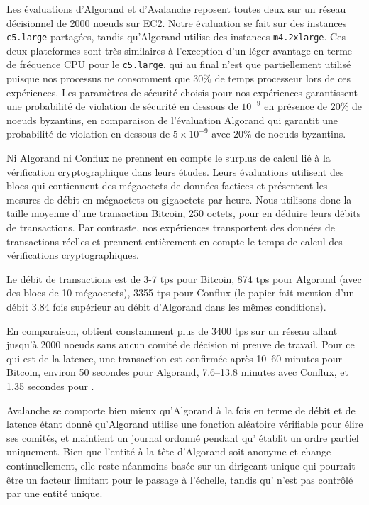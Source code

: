 Les évaluations d'Algorand et d'Avalanche reposent toutes deux sur un réseau décisionnel de 2000 noeuds sur EC2.
Notre évaluation se fait sur des instances \texttt{c5.large} partagées, tandis qu'Algorand utilise des instances
\texttt{m4.2xlarge}\@. Ces deux plateformes sont très similaires à l'exception d'un léger avantage en terme de
fréquence CPU pour le \texttt{c5.large}, qui au final n'est que partiellement utilisé puisque nos processus ne
consomment que $30\%$ de temps processeur lors de ces expériences. Les paramètres de sécurité choisis pour nos
expériences garantissent une probabilité de violation de sécurité en dessous de $10^{-9}$ en présence de
$20\%$ de noeuds byzantins, en comparaison de l'évaluation Algorand qui garantit une probabilité de violation en dessous
de $5 \times 10^{-9}$ avec $20\%$ de noeuds byzantins.

Ni Algorand ni Conflux ne prennent en compte le surplus de calcul lié à la vérification cryptographique dans leurs
études. Leurs évaluations utilisent des blocs qui contiennent des mégaoctets de données factices et présentent les
mesures de débit en mégaoctets ou gigaoctets par heure. Nous utilisons donc la taille moyenne d'une transaction
Bitcoin, 250 octets, pour en déduire leurs débits de transactions. Par contraste, nos expériences transportent des
données de transactions réelles et prennent entièrement en compte le temps de calcul des vérifications cryptographiques.

Le débit de transactions est de 3-7 tps pour Bitcoin, 874 tps pour Algorand (avec des blocs de 10 mégaoctets), 3355 tps
pour Conflux (le papier fait mention d'un débit 3.84 fois supérieur au débit d'Algorand dans les mêmes conditions).

En comparaison, {\sysname} obtient constamment plus de 3400 tps sur un réseau allant jusqu'à 2000 noeuds
sans aucun comité de décision ni preuve de travail. Pour ce qui est de la latence, une transaction est confirmée
après 10--60 minutes pour Bitcoin, environ 50 secondes pour Algorand, 7.6--13.8 minutes avec Conflux, et 1.35 secondes
pour {\sysname}.

Avalanche se comporte bien mieux qu'Algorand à la fois en terme de débit et de latence étant donné qu'Algorand utilise une
fonction aléatoire vérifiable pour élire ses comités, et maintient un journal ordonné pendant qu'{\sysname} établit
un ordre partiel uniquement. Bien que l'entité à la tête d'Algorand soit anonyme et change continuellement, elle reste
néanmoins basée sur un dirigeant unique qui pourrait être un facteur limitant pour le passage à l'échelle, tandis
qu'{\sysname} n'est pas contrôlé par une entité unique.

